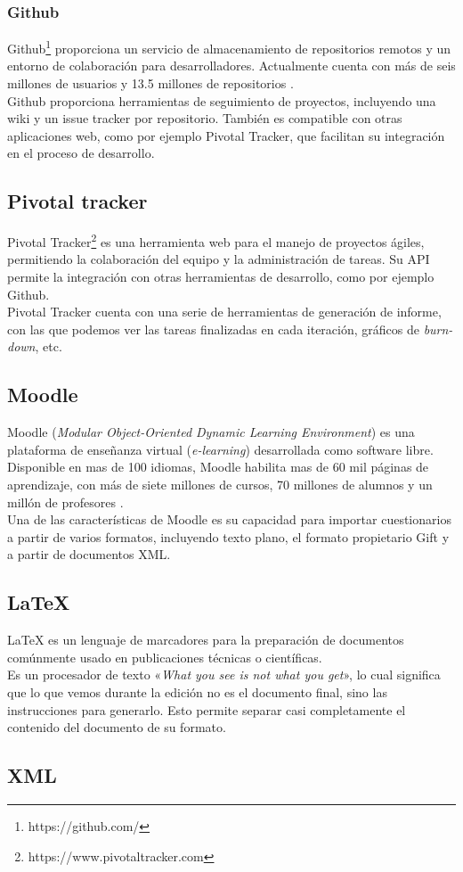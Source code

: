 \subsubsection{Github}

Github\footnote{https://github.com/} proporciona un servicio de almacenamiento de repositorios remotos y un entorno de colaboración para desarrolladores.
Actualmente cuenta con más de seis millones de usuarios y 13.5 millones de repositorios \cite{website:github}.
\\
Github proporciona herramientas de seguimiento de proyectos, incluyendo una wiki y un issue tracker por repositorio.
También es compatible con otras aplicaciones web, como por ejemplo Pivotal Tracker, que facilitan su integración en el proceso de desarrollo.

\subsection{Pivotal tracker}

Pivotal Tracker\footnote{https://www.pivotaltracker.com} es una herramienta web para el manejo de proyectos ágiles, permitiendo la colaboración del equipo y la administración de tareas.
Su API permite la integración con otras herramientas de desarrollo, como por ejemplo Github.
\\
Pivotal Tracker cuenta con una serie de herramientas de generación de informe, con las que podemos ver las tareas finalizadas en cada iteración, gráficos de \emph{burn-down}, etc.

\subsection{Moodle}

Moodle (\emph{Modular Object-Oriented Dynamic Learning Environment}) es una plataforma de enseñanza virtual (\emph{e-learning}) desarrollada como software libre.
Disponible en mas de 100 idiomas, Moodle habilita mas de 60 mil páginas de aprendizaje, con más de siete millones de cursos, 70 millones de alumnos y un millón de profesores \cite{website:moodle}.
\\
Una de las características de Moodle es su capacidad para importar cuestionarios a partir de varios formatos, incluyendo texto plano, el formato propietario Gift y a partir de documentos XML.

\subsection{\LaTeX{}}

\LaTeX{} es un lenguaje de marcadores para la preparación de documentos comúnmente usado en publicaciones técnicas o científicas.
\\
Es un procesador de texto «\emph{What you see is not what you get}», lo cual significa que lo que vemos durante la edición no es el 
documento final, sino las instrucciones para generarlo.
Esto permite separar casi completamente el contenido del documento de su formato.

\subsection{XML}

